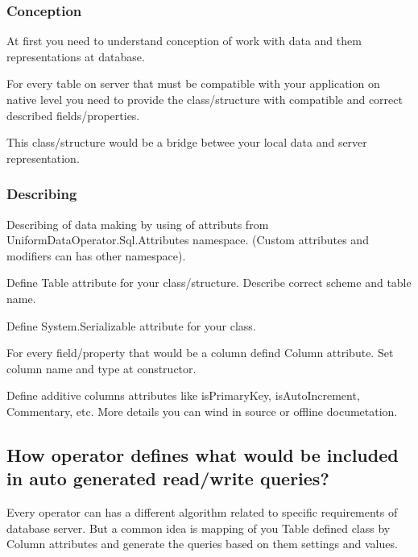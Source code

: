\subsubsection*{Conception}

At first you need to understand conception of work with data and them representations at database.

For every table on server that must be compatible with your application on native level you need to provide the class/structure with compatible and correct described fields/properties.

This class/structure would be a bridge betwee your local data and server representation.

\subsubsection*{Describing}

Describing of data making by using of attributs from {\ttfamily Uniform\+Data\+Operator.\+Sql.\+Attributes} namespace. (Custom attributes and modifiers can has other namespace).


\begin{DoxyEnumerate}
\item Define {\ttfamily Table} attribute for your class/structure. Describe correct scheme and table name.
\item Define {\ttfamily System.\+Serializable} attribute for your class.
\item For every field/property that would be a column defind {\ttfamily Column} attribute. Set column name and type at constructor.
\item Define additive columns\textquotesingle{} attributes like {\ttfamily is\+Primary\+Key}, {\ttfamily is\+Auto\+Increment}, {\ttfamily Commentary}, etc. More details you can wind in source or offline documetation.
\end{DoxyEnumerate}

\subsection*{How operator defines what would be included in auto generated read/write queries?}

Every operator can has a different algorithm related to specific requirements of database server. But a common idea is mapping of you \textquotesingle{}Table\textquotesingle{} defined class by {\ttfamily Column} attributes and generate the queries based on them settings and values.


